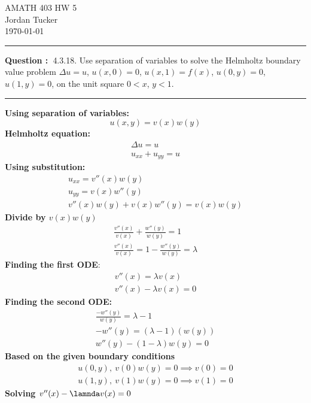 \documentclass[letterpaper,11pt]{article}
\newcounter{questionCounter}
\newcounter{partCounter}[questionCounter]
\newcommand{\question}[1]{%
    \stepcounter{questionCounter}%
    \setcounter{partCounter}{0}%
    \vspace{0.25in}
    \hrule
    \vspace{0.4em}
    \noindent\textbf{Question \thequestionCounter:\ }#1
    \vspace{0.8em}
    \hrule
    \vspace{0.1in}
}
\newcommand{\myhwname}{AMATH 403 HW 5}
\newcommand{\myname}{Jordan Tucker}
\newcommand{\header}{
    \begin{center}
    {\Large \myhwname}\\
    \myname\\
    \today
    \end{center}
}
\begin{document}
    \header
    \question{4.3.18. Use separation of variables to solve the Helmholtz boundary value problem
        $\Delta u =u $,  $u(x, 0) = 0$, $u(x, 1) = f (x)$, $u(0, y) = 0$, $u(1, y) = 0$, on the unit square $ 0 < x$, $y < 1$.}

    \textbf{Using separation of variables:}
    \[
        u(x,y) = v(x)w(y)
    \]
    \textbf{Helmholtz equation:}
    \begin{gather*}
        \Delta u = u \\
        u_{xx} + u_{yy} = u
    \end{gather*}
    \textbf{Using substitution:}
    \begin{gather*}
        u_{xx} = v''(x)w(y)\\
        u_{yy} = v(x)w''(y)\\
        v''(x)w(y) + v(x)w''(y) = v(x)w(y)
    \end{gather*}
    \textbf{Divide by $v(x)w(y)$}
    \begin{gather*}
        \frac{v''(x)}{v(x)}+\frac{w''(y)}{w(y)} = 1\\
        \frac{v''(x)}{v(x)} =  1 - \frac{w''(y)}{w(y)} = \lambda
    \end{gather*}
    \textbf{Finding the first ODE}:
    \begin{gather*}
        v''(x) = \lambda v(x)\\
        v''(x) - \lambda v(x) =0
    \end{gather*}
    \textbf{Finding the second ODE:}
    \begin{gather*}
          \frac{- w''(y)}{w(y)} = \lambda -1 \\
        -w''(y) = (\lambda -1)(w(y))\\
        w''(y) - (1 - \lambda) w(y) = 0
    \end{gather*}
    \textbf{Based on the given boundary conditions}
    \begin{gather*}
        u(0,y), \ v(0)w(y) =0 \implies v(0)=0\\
        u(1,y), \ v(1)w(y) = 0 \implies v(1)=0
    \end{gather*}
    \textbf{Solving $v''(x) - \lamnda v(x) =0$}
\end{document}
